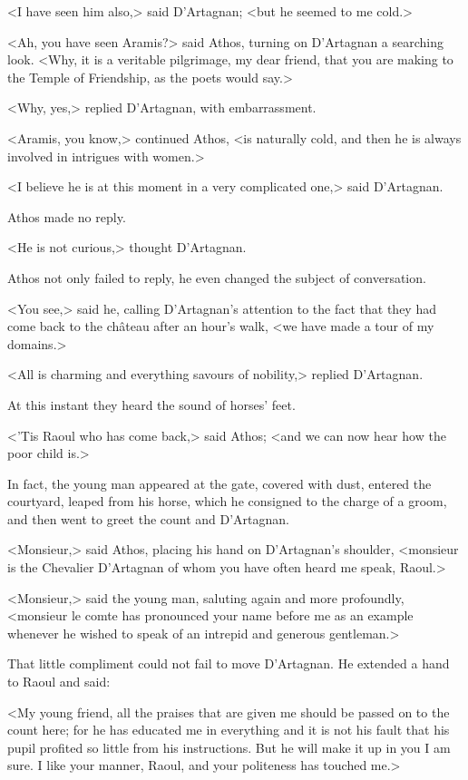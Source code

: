 <I have seen him also,> said D'Artagnan; <but he seemed to me cold.>

<Ah, you have seen Aramis?> said Athos, turning on D'Artagnan a searching look. <Why, it is a veritable pilgrimage, my dear friend, that you are making to the Temple of Friendship, as the poets would say.>

<Why, yes,> replied D'Artagnan, with embarrassment.

<Aramis, you know,> continued Athos, <is naturally cold, and then he is always involved in intrigues with women.>

<I believe he is at this moment in a very complicated one,> said D'Artagnan.

Athos made no reply.

<He is not curious,> thought D'Artagnan.

Athos not only failed to reply, he even changed the subject of conversation.

<You see,> said he, calling D'Artagnan's attention to the fact that they had come back to the château after an hour's walk, <we have made a tour of my domains.>

<All is charming and everything savours of nobility,> replied D'Artagnan.

At this instant they heard the sound of horses' feet.

<'Tis Raoul who has come back,> said Athos; <and we can now hear how the poor child is.>

In fact, the young man appeared at the gate, covered with dust, entered the courtyard, leaped from his horse, which he consigned to the charge of a groom, and then went to greet the count and D'Artagnan.

<Monsieur,> said Athos, placing his hand on D'Artagnan's shoulder, <monsieur is the Chevalier D'Artagnan of whom you have often heard me speak, Raoul.>

<Monsieur,> said the young man, saluting again and more profoundly, <monsieur le comte has pronounced your name before me as an example whenever he wished to speak of an intrepid and generous gentleman.>

That little compliment could not fail to move D'Artagnan. He extended a hand to Raoul and said:

<My young friend, all the praises that are given me should be passed on to the count here; for he has educated me in everything and it is not his fault that his pupil profited so little from his instructions. But he will make it up in you I am sure. I like your manner, Raoul, and your politeness has touched me.>

